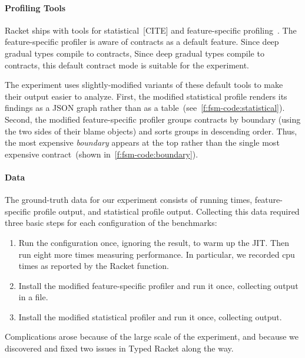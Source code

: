 \paragraph{Profiling Tools}

Racket ships with tools for statistical~[CITE] and feature-specific
profiling~\cite{}.
The feature-specific profiler is aware of contracts as a default feature.
Since deep gradual types compile to contracts,
Since deep gradual types compile to contracts, this default contract
mode is suitable for the experiment.

The experiment uses slightly-modified variants of these default tools
to make their output easier to analyze.
First, the modified statistical profile renders its
findings as a JSON graph rather than as a table~(see~\cref{f:fsm-code:statistical}).
Second, the modified feature-specific profiler groups contracts
by boundary (using the two sides of their blame objects) and sorts groups
in descending order.
Thus, the most expensive \emph{boundary} appears at the top rather than the single
most expensive contract~(shown in~\cref{f:fsm-code:boundary}).


\paragraph{Data} 

The ground-truth data for our experiment consists of running times,
feature-specific profile output, and statistical profile output.
Collecting this data required three basic steps for each configuration
of the \numgtp{} benchmarks:
\begin{enumerate}
  \item
    Run the configuration once, ignoring the result, to warm up the JIT.
    Then run eight more times measuring performance.
    In particular, we recorded {cpu time}s as reported by the Racket
     function.
  \item
    Install the modified feature-specific profiler and run it once,
    collecting output in a file.
  \item
    Install the modified statistical profiler and run it once, collecting output.
\end{enumerate}
Complications arose because of the large scale of the experiment, and because
we discovered and fixed two issues in Typed Racket along the way.


